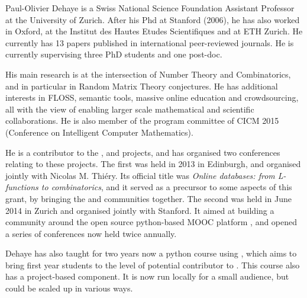 \begin{participant}[type=leadPI,PM=13,gender=male]{Paul-Olivier Dehaye}
  is a Swiss National Science Foundation Assistant Professor at the
  University of Zurich. After his Phd at Stanford (2006), he has also worked in Oxford, at
  the Institut des Hautes Etudes Scientifiques and at ETH Zurich. He currently has 13
  papers published in international peer-reviewed journals. He is currently supervising
  three PhD students and one post-doc.

  His main research is at the intersection of Number Theory and Combinatorics, and in
  particular in Random Matrix Theory conjectures. He has additional interests in FLOSS,
  semantic tools, massive online education and crowdsourcing, all with the view of
  enabling larger scale mathematical and scientific collaborations. He is also member of
  the program committee of CICM 2015 (Conference on Intelligent Computer Mathematics).

  He is a contributor to the \Sage, \LMFDB and \OpenEdX projects, and has organised two
  conferences relating to these projects. The first was held in 2013 in Edinburgh, and
  organised jointly with Nicolas M. Thiéry. Its official title was \emph{Online databases:
    from L-functions to combinatorics}, and it served as a precursor to some aspects of
  this grant, by bringing the \SageCombinat and \LMFDB communities together.  The second
  was held in June 2014 in Zurich and organised jointly with Stanford. It aimed at
  building a community around the open source python-based MOOC platform \OpenEdX, and
  opened a series of conferences now held twice annually.

  Dehaye has also taught for two years now a python course using \OpenEdX, which aims to
  bring first year students to the level of potential contributor to \Sage. This course
  also has a project-based component. It is now run locally for a small audience, but
  could be scaled up in various ways.
\end{participant}


